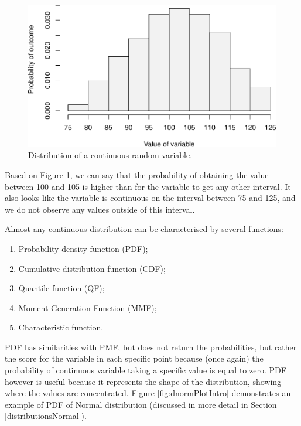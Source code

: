 \documentclass[
]{book}
\providecommand{\tightlist}{%
  \setlength{\itemsep}{0pt}\setlength{\parskip}{0pt}}
\theoremstyle{definition}
\theoremstyle{definition}
\theoremstyle{definition}
\theoremstyle{definition}
\theoremstyle{remark}
\begin{document}
\begin{figure}
\centering
\includegraphics{Svetunkov---Statistics-for-Business-Analytics_files/figure-latex/distributionContinuousExample-1.pdf}
\caption{\label{fig:distributionContinuousExample}Distribution of a continuous random variable.}
\end{figure}

Based on Figure \ref{fig:distributionContinuousExample}, we can say that the probability of obtaining the value between 100 and 105 is higher than for the variable to get any other interval. It also looks like the variable is continuous on the interval between 75 and 125, and we do not observe any values outside of this interval.

Almost any continuous distribution can be characterised by several functions:

\begin{enumerate}
\def\labelenumi{\arabic{enumi}.}
\tightlist
\item
  Probability density function (PDF);
\item
  Cumulative distribution function (CDF);
\item
  Quantile function (QF);
\item
  Moment Generation Function (MMF);
\item
  Characteristic function.
\end{enumerate}

PDF has similarities with PMF, but does not return the probabilities, but rather the score for the variable in each specific point because (once again) the probability of continuous variable taking a specific value is equal to zero. PDF however is useful because it represents the shape of the distribution, showing where the values are concentrated. Figure \ref{fig:dnormPlotIntro} demonstrates an example of PDF of Normal distribution (discussed in more detail in Section \ref{distributionsNormal}).
\end{document}
